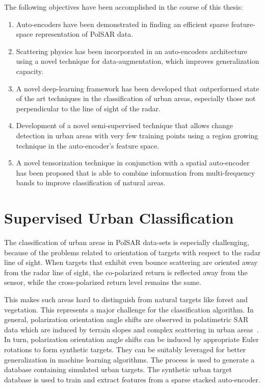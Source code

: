\documentclass[12pt, a4paper]{article}
\begin{document}
The following objectives have been accomplished in the course of this thesis:

\begin{enumerate}
\item Auto-encoders have been demonstrated in finding an efficient sparse feature-space representation of PolSAR data.
\item Scattering physics has been incorporated in an auto-encoders architecture using a novel technique for data-augmentation, which improves generalization capacity. 
\item A novel deep-learning framework has been developed that outperformed state of the art techniques in the classification of urban areas, especially those not perpendicular to the line of sight of the radar.
\item Development of a novel semi-supervised technique that allows change detection in urban areas with very few training points using a region growing technique in the auto-encoder's feature space. 
\item A novel tensorization technique in conjunction with a spatial auto-encoder has been proposed that is able to combine information from multi-frequency bands to improve classification of natural areas.
\end{enumerate}


\section{Supervised Urban Classification }
The classification of urban areas in PolSAR data-sets is especially challenging, because of the problems related to orientation of targets with respect to the radar line of sight. When targets that exhibit even bounce scattering are oriented away from the radar line of sight, the co-polarized return is reflected away from the sensor, while the cross-polarized return level remains the same.

This makes such areas hard to distinguish from natural targets like forest and vegetation. This represents a major challenge for the classification algorithm\cite{hirose2006complex}. In general, polarization orientation angle shifts are observed in polatimetric SAR data which are induced by terrain slopes and complex scattering in urban
areas~\cite{yamaguchi2011four}. In turn, polarization orientation angle shifts can be induced by appropriate Euler rotations to form synthetic targets. They can be suitably leveraged for better generalization in machine learning algorithms. The process is used to generate a database containing simulated urban targets. The synthetic urban target database is used to train and extract features from a sparse stacked auto-encoder. 
\end{document}
